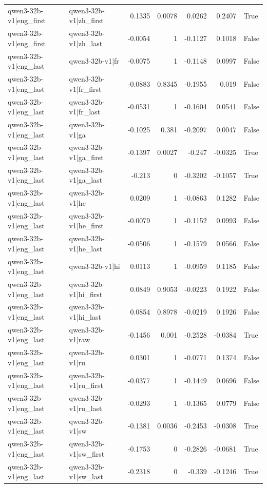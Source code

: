\begin{table}
\begin{tabular}{l l r r r r l}
qwen3-32b-v1|eng_first & qwen3-32b-v1|zh_first & 0.1335 & 0.0078 & 0.0262 & 0.2407 & True \\
qwen3-32b-v1|eng_first & qwen3-32b-v1|zh_last & -0.0054 & 1 & -0.1127 & 0.1018 & False \\
qwen3-32b-v1|eng_last & qwen3-32b-v1|fr & -0.0075 & 1 & -0.1148 & 0.0997 & False \\
qwen3-32b-v1|eng_last & qwen3-32b-v1|fr_first & -0.0883 & 0.8345 & -0.1955 & 0.019 & False \\
qwen3-32b-v1|eng_last & qwen3-32b-v1|fr_last & -0.0531 & 1 & -0.1604 & 0.0541 & False \\
qwen3-32b-v1|eng_last & qwen3-32b-v1|ga & -0.1025 & 0.381 & -0.2097 & 0.0047 & False \\
qwen3-32b-v1|eng_last & qwen3-32b-v1|ga_first & -0.1397 & 0.0027 & -0.247 & -0.0325 & True \\
qwen3-32b-v1|eng_last & qwen3-32b-v1|ga_last & -0.213 & 0 & -0.3202 & -0.1057 & True \\
qwen3-32b-v1|eng_last & qwen3-32b-v1|he & 0.0209 & 1 & -0.0863 & 0.1282 & False \\
qwen3-32b-v1|eng_last & qwen3-32b-v1|he_first & -0.0079 & 1 & -0.1152 & 0.0993 & False \\
qwen3-32b-v1|eng_last & qwen3-32b-v1|he_last & -0.0506 & 1 & -0.1579 & 0.0566 & False \\
qwen3-32b-v1|eng_last & qwen3-32b-v1|hi & 0.0113 & 1 & -0.0959 & 0.1185 & False \\
qwen3-32b-v1|eng_last & qwen3-32b-v1|hi_first & 0.0849 & 0.9053 & -0.0223 & 0.1922 & False \\
qwen3-32b-v1|eng_last & qwen3-32b-v1|hi_last & 0.0854 & 0.8978 & -0.0219 & 0.1926 & False \\
qwen3-32b-v1|eng_last & qwen3-32b-v1|raw & -0.1456 & 0.001 & -0.2528 & -0.0384 & True \\
qwen3-32b-v1|eng_last & qwen3-32b-v1|ru & 0.0301 & 1 & -0.0771 & 0.1374 & False \\
qwen3-32b-v1|eng_last & qwen3-32b-v1|ru_first & -0.0377 & 1 & -0.1449 & 0.0696 & False \\
qwen3-32b-v1|eng_last & qwen3-32b-v1|ru_last & -0.0293 & 1 & -0.1365 & 0.0779 & False \\
qwen3-32b-v1|eng_last & qwen3-32b-v1|sw & -0.1381 & 0.0036 & -0.2453 & -0.0308 & True \\
qwen3-32b-v1|eng_last & qwen3-32b-v1|sw_first & -0.1753 & 0 & -0.2826 & -0.0681 & True \\
qwen3-32b-v1|eng_last & qwen3-32b-v1|sw_last & -0.2318 & 0 & -0.339 & -0.1246 & True \\

\end{tabular}
\end{table}
